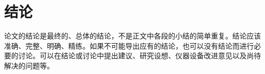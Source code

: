 \chapter{结论}
\label{cha:chap5}

论文的结论是最终的、总体的结论，不是正文中各段的小结的简单重复。结论应该准确、完整、明确、精练。如果不可能导出应有的结论，也可以没有结论而进行必要的讨论。可以在结论或讨论中提出建议、研究设想、仪器设备改进意见以及尚待解决的问题等。